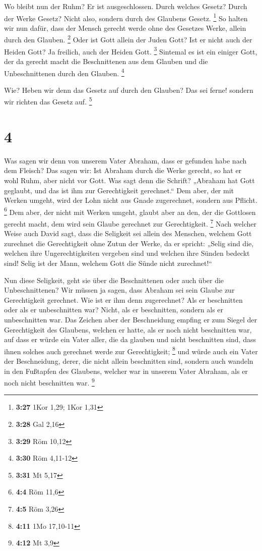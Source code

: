  Wo bleibt nun der Ruhm? Er ist ausgeschlossen. Durch
welches Gesetz? Durch der Werke Gesetz? Nicht also, sondern durch des
Glaubens Gesetz. \footnote{\textbf{3:27} 1Kor 1,29; 1Kor 1,31}
 So halten wir nun dafür, dass der Mensch gerecht werde
ohne des Gesetzes Werke, allein durch den Glauben. \footnote{\textbf{3:28}
  Gal 2,16}  Oder ist Gott allein der Juden Gott? Ist er
nicht auch der Heiden Gott? Ja freilich, auch der Heiden Gott.
\footnote{\textbf{3:29} Röm 10,12}  Sintemal es ist ein
einiger Gott, der da gerecht macht die Beschnittenen aus dem Glauben und
die Unbeschnittenen durch den Glauben. \footnote{\textbf{3:30} Röm
  4,11-12}

 Wie? Heben wir denn das Gesetz auf durch den Glauben? Das
sei ferne! sondern wir richten das Gesetz auf. \footnote{\textbf{3:31}
  Mt 5,17}

\hypertarget{section-1}{%
\section{4}\label{section-1}}

 Was sagen wir denn von unserem Vater Abraham, dass er
gefunden habe nach dem Fleisch?  Das sagen wir: Ist Abraham
durch die Werke gerecht, so hat er wohl Ruhm, aber nicht vor Gott.
 Was sagt denn die Schrift? „Abraham hat Gott geglaubt, und
das ist ihm zur Gerechtigkeit gerechnet.``  Dem aber, der
mit Werken umgeht, wird der Lohn nicht aus Gnade zugerechnet, sondern
aus Pflicht. \footnote{\textbf{4:4} Röm 11,6}  Dem aber, der
nicht mit Werken umgeht, glaubt aber an den, der die Gottlosen gerecht
macht, dem wird sein Glaube gerechnet zur Gerechtigkeit. \footnote{\textbf{4:5}
  Röm 3,26}  Nach welcher Weise auch David sagt, dass die
Seligkeit sei allein des Menschen, welchem Gott zurechnet die
Gerechtigkeit ohne Zutun der Werke, da er spricht:  „Selig
sind die, welchen ihre Ungerechtigkeiten vergeben sind und welchen ihre
Sünden bedeckt sind!  Selig ist der Mann, welchem Gott die
Sünde nicht zurechnet!{}``

 Nun diese Seligkeit, geht sie über die Beschnittenen oder
auch über die Unbeschnittenen? Wir müssen ja sagen, dass Abraham sei
sein Glaube zur Gerechtigkeit gerechnet.  Wie ist er ihm
denn zugerechnet? Als er beschnitten oder als er unbeschnitten war?
Nicht, als er beschnitten, sondern als er unbeschnitten war.
 Das Zeichen aber der Beschneidung empfing er zum Siegel
der Gerechtigkeit des Glaubens, welchen er hatte, als er noch nicht
beschnitten war, auf dass er würde ein Vater aller, die da glauben und
nicht beschnitten sind, dass ihnen solches auch gerechnet werde zur
Gerechtigkeit; \footnote{\textbf{4:11} 1Mo 17,10-11}  und
würde auch ein Vater der Beschneidung, derer, die nicht allein
beschnitten sind, sondern auch wandeln in den Fußtapfen des Glaubens,
welcher war in unserem Vater Abraham, als er noch nicht beschnitten war.
\footnote{\textbf{4:12} Mt 3,9}

